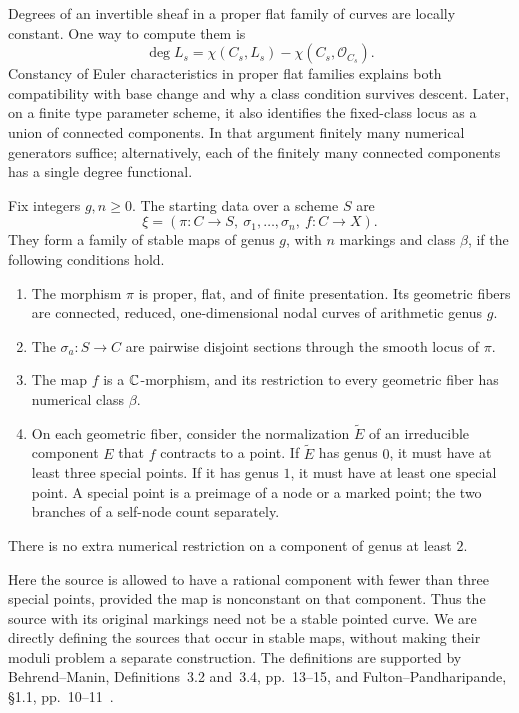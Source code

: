 Degrees of an invertible sheaf in a proper flat family of curves are locally constant. One way to compute them is
\[
 \deg L_s=\chi(C_s,L_s)-\chi(C_s,\mathcal O_{C_s}).
\]
Constancy of Euler characteristics in proper flat families explains both compatibility with base change and why a class condition survives descent. Later, on a finite type parameter scheme, it also identifies the fixed-class locus as a union of connected components. In that argument finitely many numerical generators suffice; alternatively, each of the finitely many connected components has a single degree functional.

\begin{Def}\label{maps:definition}
Fix integers $g,n\geq0$. The starting data over a scheme $S$ are
\[
 \xi=(\pi:C\longrightarrow S,\ \sigma_1,\ldots,\sigma_n,\ f:C\longrightarrow X).
\]
They form a family of stable maps of genus $g$, with $n$ markings and class $\beta$, if the following conditions hold.
\begin{enumerate}
 \item The morphism $\pi$ is proper, flat, and of finite presentation. Its geometric fibers are connected, reduced, one-dimensional nodal curves of arithmetic genus $g$.
 \item The $\sigma_a:S\to C$ are pairwise disjoint sections through the smooth locus of $\pi$.
 \item The map $f$ is a $\mathbb C$-morphism, and its restriction to every geometric fiber has numerical class $\beta$.
 \item On each geometric fiber, consider the normalization $\widetilde E$ of an irreducible component $E$ that $f$ contracts to a point. If $\widetilde E$ has genus $0$, it must have at least three special points. If it has genus $1$, it must have at least one special point. A special point is a preimage of a node or a marked point; the two branches of a self-node count separately.
\end{enumerate}
There is no extra numerical restriction on a component of genus at least $2$.
\end{Def}

Here the source is allowed to have a rational component with fewer than three special points, provided the map is nonconstant on that component. Thus the source with its original markings need not be a stable pointed curve. We are directly defining the sources that occur in stable maps, without making their moduli problem a separate construction. The definitions are supported by Behrend--Manin, Definitions~3.2 and~3.4, pp.~13--15, and Fulton--Pandharipande, \S1.1, pp.~10--11~\cite{BM,FP}.

